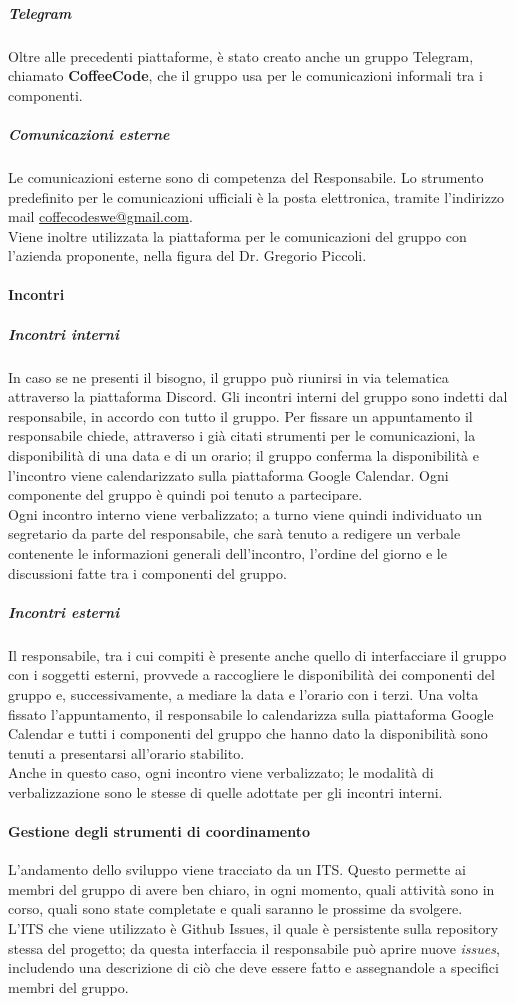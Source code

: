 \documentclass[../norme-di-progetto.tex]{subfiles}
\begin{document}
\subparagraph*{Telegram}
Oltre alle precedenti piattaforme, è stato creato anche un gruppo Telegram, chiamato \textbf{CoffeeCode}, che il gruppo usa per le comunicazioni informali tra i componenti.

\subparagraph{Comunicazioni esterne}
Le comunicazioni esterne sono di competenza del Responsabile. Lo strumento predefinito per le comunicazioni ufficiali è la posta elettronica, tramite l'indirizzo mail \href{coffecodeswe@gmail.com}{coffecodeswe@gmail.com}. \\
Viene inoltre utilizzata la piattaforma  per le comunicazioni del gruppo con l'azienda proponente, nella figura del Dr. Gregorio Piccoli.

\paragraph{Incontri}
\subparagraph{Incontri interni}
In caso se ne presenti il bisogno, il gruppo può riunirsi in via telematica attraverso la piattaforma Discord. Gli incontri interni del gruppo sono indetti dal responsabile, in accordo con tutto il gruppo. Per fissare un appuntamento il responsabile chiede, attraverso i già citati strumenti per le comunicazioni, la disponibilità di una data e di un orario; il gruppo conferma la disponibilità e l'incontro viene calendarizzato sulla piattaforma Google Calendar. Ogni componente del gruppo è quindi poi tenuto a partecipare. \\
Ogni incontro interno viene verbalizzato; a turno viene quindi individuato un segretario da parte del responsabile, che sarà tenuto a redigere un verbale contenente le informazioni generali dell'incontro, l'ordine del giorno e le discussioni fatte tra i componenti del gruppo.

\subparagraph{Incontri esterni}
Il responsabile, tra i cui compiti è presente anche quello di interfacciare il gruppo con i soggetti esterni, provvede a raccogliere le disponibilità dei componenti del gruppo e, successivamente, a mediare la data e l'orario con i terzi. Una volta fissato l'appuntamento, il responsabile lo calendarizza sulla piattaforma Google Calendar e tutti i componenti del gruppo che hanno dato la disponibilità sono tenuti a presentarsi all'orario stabilito. \\
Anche in questo caso, ogni incontro viene verbalizzato; le modalità di verbalizzazione sono le stesse di quelle adottate per gli incontri interni.

\paragraph{Gestione degli strumenti di coordinamento}
L'andamento dello sviluppo viene tracciato da un ITS. Questo permette ai membri del gruppo di avere ben chiaro, in ogni momento, quali attività sono in corso, quali sono state completate e quali saranno le prossime da svolgere. \\
L'ITS che viene utilizzato è Github Issues, il quale è persistente sulla repository stessa del progetto; da questa interfaccia il responsabile può aprire nuove \textit{issues}, includendo una descrizione di ciò che deve essere fatto e assegnandole a specifici membri del gruppo.
\end{document}
